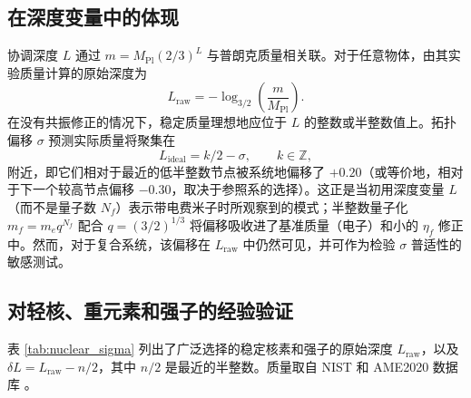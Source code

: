 \documentclass[12pt,a4paper]{article}
\begin{document}
	\subsection{在深度变量中的体现}
	
	协调深度 $L$ 通过 $m = M_{\mathrm{Pl}}(2/3)^L$ 与普朗克质量相关联。对于任意物体，由其实验质量计算的原始深度为
	\begin{equation}
		L_{\mathrm{raw}} = -\log_{3/2}\!\left(\frac{m}{M_{\mathrm{Pl}}}\right).
	\end{equation}
	在没有共振修正的情况下，稳定质量理想地应位于 $L$ 的整数或半整数值上。拓扑偏移 $\sigma$ 预测实际质量将聚集在
	\[
	L_{\mathrm{ideal}} = k/2 - \sigma, \qquad k\in\mathbb{Z},
	\]
	附近，即它们相对于最近的低半整数节点被系统地偏移了 $+0.20$（或等价地，相对于下一个较高节点偏移 $-0.30$，取决于参照系的选择）。这正是当初用深度变量 $L$（而不是量子数 $N_f$）表示带电费米子时所观察到的模式；半整数量子化 $m_f = m_e q^{N_f}$ 配合 $q=(3/2)^{1/3}$ 将偏移吸收进了基准质量（电子）和小的 $\eta_f$ 修正中。然而，对于复合系统，该偏移在 $L_{\mathrm{raw}}$ 中仍然可见，并可作为检验 $\sigma$ 普适性的敏感测试。
	
	\subsection{对轻核、重元素和强子的经验验证}
	
	表 \ref{tab:nuclear_sigma} 列出了广泛选择的稳定核素和强子的原始深度 $L_{\mathrm{raw}}$，以及 $\delta L = L_{\mathrm{raw}} - n/2$，其中 $n/2$ 是最近的半整数。质量取自 NIST 和 AME2020 数据库 \cite{AME2020}。
	
\end{document}
